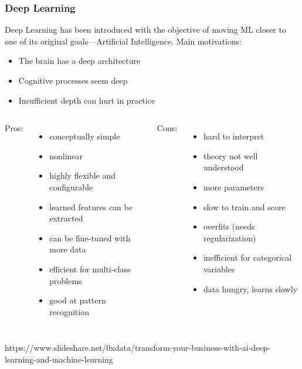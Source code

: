 \begin{frame}
  \MyLogo
  \frametitle{Deep Learning}  

\small

\begin{mdframed}[style=mystyle2]
Deep Learning has been introduced with the objective of moving ML closer to one of its original goals---Artificial \alert{Intelligence}. Main motivations:
%
\begin{itemize}\scriptsize\setlength\itemsep{0.1em}
\item The brain has a deep architecture
\item Cognitive processes seem deep
\item Insufficient depth can hurt in practice
\end{itemize}
\end{mdframed}

\medskip

\begin{columns}

{\color{blue}Pros:}
\begin{itemize}\setlength\itemsep{0.2em}
\item conceptually simple
\item nonlinear 
\item highly flexible and configurable
\item learned features can be extracted
\item can be fine-tuned with more data
\item efficient for multi-class problems
\item good at pattern recognition
\end{itemize}

{\color{red}Cons:}
\begin{itemize}\setlength\itemsep{0.2em}
\item hard to interpret 
\item theory not well understood
\item more parameters
\item slow to train and score
\item overfits (needs regularization)
\item inefficient for categorical variables
\item data hungry, learns slowly 
\end{itemize}
\end{columns}

\begin{center}
{\color{red} \scriptsize
https://www.slideshare.net/0xdata/transform-your-business-with-ai-deep-learning-and-machine-learning}
\end{center}

\end{frame}

